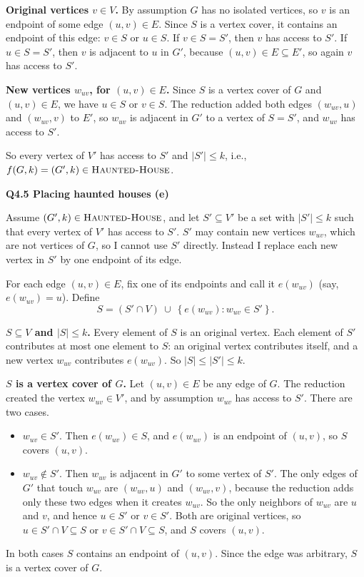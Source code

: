 \documentclass[11pt]{article}
\newcommand{\set}[1]{\left\{#1\right\}}
\newcommand{\abs}[1]{\left|#1\right|}
\newcommand{\cproblem}[1]{\textsc{#1}}
\newcommand{\HH}{\cproblem{Haunted-House}}
\newcommand{\qpage}[1]{\clearpage\noindent\textbf{\large #1}\par\medskip}
\begin{document}
\textbf{Original vertices $v \in V$.}
By assumption $G$ has no isolated vertices, so $v$ is an endpoint of some edge $(u, v) \in E$.
Since $S$ is a vertex cover, it contains an endpoint of this edge: $v \in S$ or $u \in S$.
If $v \in S = S'$, then $v$ has access to $S'$.
If $u \in S = S'$, then $v$ is adjacent to $u$ in $G'$, because $(u, v) \in E \subseteq E'$, so again $v$ has access to $S'$.

\textbf{New vertices $w_{uv}$, for $(u, v) \in E$.}
Since $S$ is a vertex cover of $G$ and $(u, v) \in E$, we have $u \in S$ or $v \in S$.
The reduction added both edges $(w_{uv}, u)$ and $(w_{uv}, v)$ to $E'$, so $w_{uv}$ is adjacent in $G'$ to a vertex of $S = S'$, and $w_{uv}$ has access to $S'$.

So every vertex of $V'$ has access to $S'$ and $\abs{S'} \leq k$, i.e., $f(G, k) = (G', k) \in \HH$.

\qpage{Q4.5 Placing haunted houses (e)}

Assume $(G', k) \in \HH$, and let $S' \subseteq V'$ be a set with $\abs{S'} \leq k$ such that every vertex of $V'$ has access to $S'$.
$S'$ may contain new vertices $w_{uv}$, which are not vertices of $G$, so I cannot use $S'$ directly.
Instead I replace each new vertex in $S'$ by one endpoint of its edge.

For each edge $(u, v) \in E$, fix one of its endpoints and call it $e(w_{uv})$ (say, $e(w_{uv}) = u$).
Define
\[
  S = (S' \cap V) \ \cup \ \set{e(w_{uv}) : w_{uv} \in S'}.
\]

\textbf{$S \subseteq V$ and $\abs{S} \leq k$.}
Every element of $S$ is an original vertex.
Each element of $S'$ contributes at most one element to $S$: an original vertex contributes itself, and a new vertex $w_{uv}$ contributes $e(w_{uv})$.
So $\abs{S} \leq \abs{S'} \leq k$.

\textbf{$S$ is a vertex cover of $G$.}
Let $(u, v) \in E$ be any edge of $G$.
The reduction created the vertex $w_{uv} \in V'$, and by assumption $w_{uv}$ has access to $S'$.
There are two cases.
\begin{itemize}
  \item $w_{uv} \in S'$.
  Then $e(w_{uv}) \in S$, and $e(w_{uv})$ is an endpoint of $(u, v)$, so $S$ covers $(u, v)$.
  \item $w_{uv} \notin S'$.
  Then $w_{uv}$ is adjacent in $G'$ to some vertex of $S'$.
  The only edges of $G'$ that touch $w_{uv}$ are $(w_{uv}, u)$ and $(w_{uv}, v)$, because the reduction adds only these two edges when it creates $w_{uv}$.
  So the only neighbors of $w_{uv}$ are $u$ and $v$, and hence $u \in S'$ or $v \in S'$.
  Both are original vertices, so $u \in S' \cap V \subseteq S$ or $v \in S' \cap V \subseteq S$, and $S$ covers $(u, v)$.
\end{itemize}
In both cases $S$ contains an endpoint of $(u, v)$.
Since the edge was arbitrary, $S$ is a vertex cover of $G$.
\end{document}
